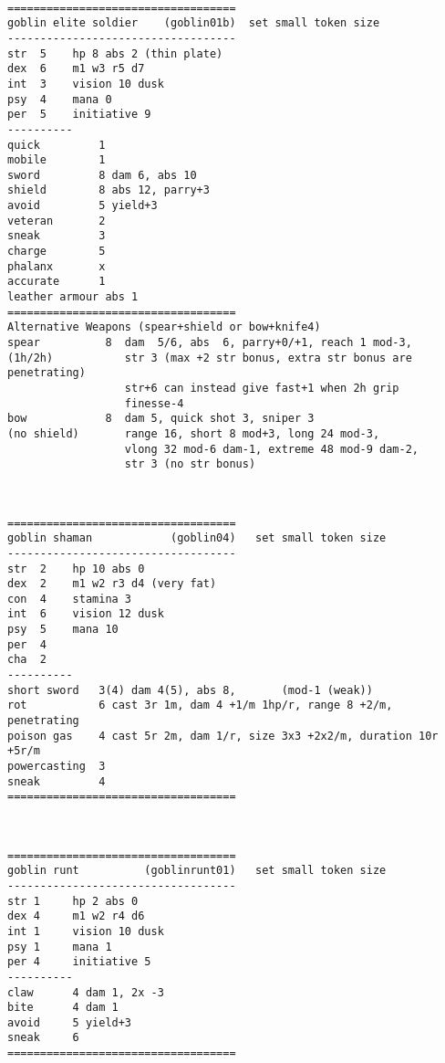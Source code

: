 \

\goodbreak \begin{samepage} \small \begin{verbatim}
===================================
goblin elite soldier    (goblin01b)  set small token size
-----------------------------------
str  5    hp 8 abs 2 (thin plate)
dex  6    m1 w3 r5 d7
int  3    vision 10 dusk
psy  4    mana 0
per  5    initiative 9
----------
quick         1
mobile        1
sword         8 dam 6, abs 10
shield        8 abs 12, parry+3
avoid         5 yield+3
veteran       2
sneak         3
charge        5
phalanx       x
accurate      1
leather armour abs 1
===================================
Alternative Weapons (spear+shield or bow+knife4)
spear          8  dam  5/6, abs  6, parry+0/+1, reach 1 mod-3,
(1h/2h)           str 3 (max +2 str bonus, extra str bonus are penetrating)
                  str+6 can instead give fast+1 when 2h grip
                  finesse-4
bow            8  dam 5, quick shot 3, sniper 3
(no shield)       range 16, short 8 mod+3, long 24 mod-3,
                  vlong 32 mod-6 dam-1, extreme 48 mod-9 dam-2,
                  str 3 (no str bonus)
\end{verbatim} \normalsize \end{samepage}

\

\goodbreak \begin{samepage} \small \begin{verbatim}
===================================
goblin shaman            (goblin04)   set small token size
-----------------------------------
str  2    hp 10 abs 0
dex  2    m1 w2 r3 d4 (very fat)
con  4    stamina 3
int  6    vision 12 dusk
psy  5    mana 10
per  4
cha  2
----------
short sword   3(4) dam 4(5), abs 8,       (mod-1 (weak))
rot           6 cast 3r 1m, dam 4 +1/m 1hp/r, range 8 +2/m, penetrating
poison gas    4 cast 5r 2m, dam 1/r, size 3x3 +2x2/m, duration 10r +5r/m
powercasting  3
sneak         4
===================================
\end{verbatim} \normalsize \end{samepage}

\

\goodbreak \begin{samepage} \small \begin{verbatim}
===================================
goblin runt          (goblinrunt01)   set small token size
-----------------------------------
str 1     hp 2 abs 0
dex 4     m1 w2 r4 d6
int 1     vision 10 dusk
psy 1     mana 1
per 4     initiative 5
----------
claw      4 dam 1, 2x -3
bite      4 dam 1
avoid     5 yield+3
sneak     6
===================================
\end{verbatim} \normalsize \end{samepage}

